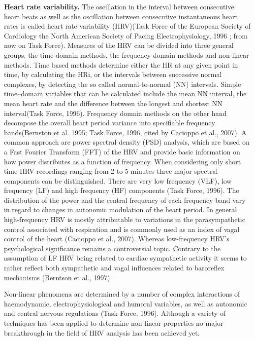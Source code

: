 \textbf{Heart rate variability.} The oscillation in the interval between consecutive heart beats as well as the oscillation between consecutive instantaneous heart rates is called heart rate variability (HRV)(Task Force of the European Society of Cardiology the North American Society of Pacing Electrophysiology, 1996 ; from now on Task Force).
Measures of the HRV can be divided into three general groups, the time domain methods, the frequency domain methods and non-linear methods. Time based methods determine either the HR at any given point in time, by calculating the HRi, or the intervals between successive normal complexes, by detecting the so called normal-to-normal (NN) intervals.
Simple time–domain variables that can be calculated include the mean NN interval, the mean heart rate and the
difference between the longest and shortest NN interval(Task Force, 1996). Frequency domain methods on the other hand decompose the overall heart period variance into specifiable frequency bands(Bernston et al. 1995; Task Force, 1996, cited by Cacioppo et al., 2007). A common approach are power spectral density (PSD) analysis, which are based on a Fast Fourier Transform (FFT) of the HRV and provide basic information on how power distributes as a function of frequency. When considering only short time HRV recordings ranging from 2 to 5 minutes three major spectral components can be distinguished. There are very low frequency (VLF), low frequency (LF) and high frequency (HF) components (Task Force, 1996). The distribution of the power and the central frequency of each frequency band vary in regard to changes in autonomic modulation of the heart period. In general high-frequency HRV is mostly attributable to variations in the parasympathetic control associated with respiration and is commonly used as an index of vagal control of the heart (Cacioppo et al., 2007). Whereas low-frequency HRV's psychological significance remains a controversial topic. Contrary to the assumption of LF HRV being related to cardiac sympathetic activity it seems to rather  reflect both sympathetic and vagal influences related to baroreflex mechanisms (Berntson et al., 1997).

Non-linear phenomena are determined by a number of complex interactions of haemodynamic, electrophysiological and humoral variables, as well as autonomic and central nervous regulations (Task Force, 1996). Although a  variety of techniques has been applied to determine non-linear properties no major breakthrough in the field of HRV analysis has been achieved yet. 



